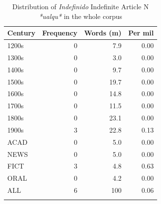\begin{table}

\begin{tabular}{lrrr}
\lsptoprule
Century &  Frequency &  Words (m) &  Per mil\\
  \midrule
  1200s& 0& 7.9& 0.00\\
  1300s& 0& 3.0& 0.00\\
  1400s& 0& 9.7& 0.00\\
  1500s& 0& 19.7& 0.00\\
  1600s& 0& 14.8& 0.00\\
  1700s& 0& 11.5& 0.00\\
  1800s& 0& 23.1& 0.00\\
  1900s& 3& 22.8& 0.13\\
  \tablevspace
  ACAD& 0& 5.0& 0.00\\
  NEWS& 0& 5.0& 0.00\\
  FICT& 3& 4.8& 0.63\\
  ORAL & 0    & 4.2  & 0.00\\
  \midrule
  ALL& 6& 100& 0.06 \\
  \lspbottomrule
\end{tabular}

\caption{Distribution of \textit{Indefinido} Indefinite Article N \textit{*ualqu*} in the whole corpus}
\label{tab:extracted10}
\end{table}

